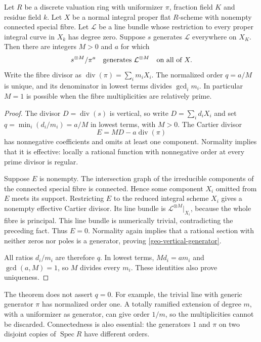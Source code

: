 \begin{theorem}\label{geo-vertical-line-rigidity}
Let $R$ be a discrete valuation ring with uniformizer $\pi$,
fraction field $K$ and residue field $k$. Let $X$ be a normal
integral proper flat $R$-scheme with nonempty connected special fibre.
Let $\mathcal L$ be a line bundle whose restriction to every proper
integral curve in $X_k$ has degree zero. Suppose $s$ generates
$\mathcal L$ everywhere on $X_K$. Then there are integers $M>0$
and $a$ for which
\begin{equation}\label{geo-vertical-generator}
                    s^{\otimes M}/\pi^a
          \quad\hbox{generates }\mathcal L^{\otimes M}
          \quad\hbox{on all of }X.
\end{equation}
Write the fibre divisor as $\operatorname{div}(\pi)=\sum_i m_iX_i$.
The normalized order $q=a/M$ is unique, and its denominator in
lowest terms divides $\gcd_i m_i$. In particular $M=1$ is possible
when the fibre multiplicities are relatively prime.
\end{theorem}
\begin{proof}
The divisor $D=\operatorname{div}(s)$ is vertical, so write
$D=\sum_i d_iX_i$ and set $q=\min_i(d_i/m_i)=a/M$ in lowest terms,
with $M>0$. The Cartier divisor
\[
                  E=MD-a\operatorname{div}(\pi)
\]
has nonnegative coefficients and omits at least one component.
Normality implies that it is effective: locally a rational
function with nonnegative order at every prime divisor is regular.

Suppose $E$ is nonempty. The intersection graph of the irreducible
components of the connected special fibre is connected. Hence
some component $X_i$ omitted from $E$ meets its support. Restricting
$E$ to the reduced integral scheme $X_i$ gives a nonempty effective
Cartier divisor. Its line bundle is
$\mathcal L^{\otimes M}|_{X_i}$, because the whole fibre is
principal. This line bundle is numerically trivial, contradicting
the preceding fact. Thus $E=0$. Normality again implies that a
rational section with neither zeros nor poles is a generator,
proving \eqref{geo-vertical-generator}.

All ratios $d_i/m_i$ are therefore $q$. In lowest terms,
$M d_i=a m_i$ and $\gcd(a,M)=1$, so $M$ divides every $m_i$.
These identities also prove uniqueness.
\end{proof}

The theorem does not assert $q=0$. For example, the trivial line
with generic generator $\pi$ has normalized order one. A totally
ramified extension of degree $m$, with a uniformizer as generator,
can give order $1/m$, so the multiplicities cannot be discarded.
Connectedness is also essential: the generators $1$ and $\pi$
on two disjoint copies of $\operatorname{Spec}R$ have different
orders.


